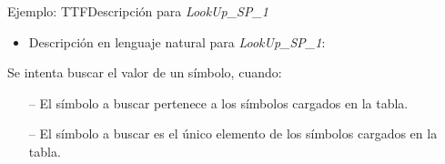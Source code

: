 \documentclass[pdf]{beamer}
\begin{document}
\begin{frame}{Ejemplo: TTF}{Descripción para \emph{LookUp\_SP\_1}}
  \begin{itemize}
    \item  Descripción en lenguaje natural para \emph{LookUp\_SP\_1}:
  \end{itemize}
  
  \begin{tcolorbox}[colback=gray!5!white,colframe=gray!50!black,
  colbacktitle=gray!75!black,title=LookUp\_ SP\_ 1]
  Se intenta buscar el valor de un símbolo, cuando:
     \begin{itemize}
        \item[--]{El símbolo a buscar pertenece a los símbolos cargados en la tabla.}
        \item[--]{El símbolo a buscar es el único elemento de los símbolos cargados en la tabla.}
     \end{itemize}
  \end{tcolorbox}
\end{frame}
\end{document}
